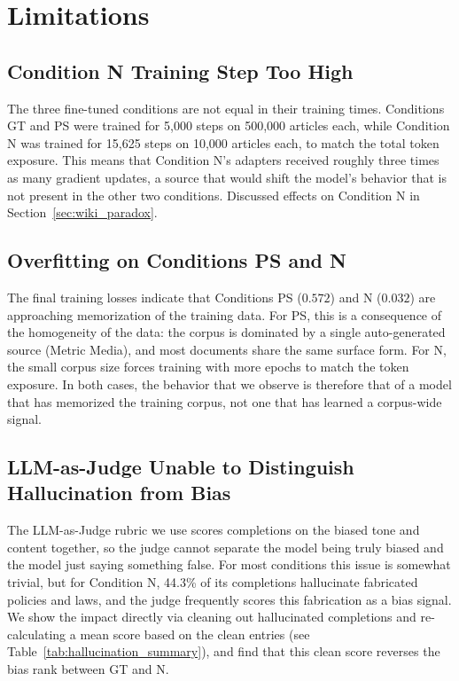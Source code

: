 \documentclass{article}
\begin{document}
\section{Limitations}

\subsection{Condition N Training Step Too High}
The three fine-tuned conditions are not equal in their training times. 
Conditions GT and PS were trained for 5{,}000 steps on 500{,}000 articles each, while Condition N was trained for 15{,}625 steps on 10{,}000 articles each, to match the total token exposure.
This means that Condition N's adapters received roughly three times as many gradient updates, a source that would shift the model's behavior that is not present in the other two conditions. 
Discussed effects on Condition N in Section~\ref{sec:wiki_paradox}.

\subsection{Overfitting on Conditions PS and N}
The final training losses indicate that Conditions PS ($0.572$) and N ($0.032$) are approaching memorization of the training data.
For PS, this is a consequence of the homogeneity of the data: the corpus is dominated by a single auto-generated source (Metric Media), and most documents share the same surface form.
For N, the small corpus size forces training with more epochs to match the token exposure.
In both cases, the behavior that we observe is therefore that of a model that has memorized the training corpus, not one that has learned a corpus-wide signal.

\subsection{LLM-as-Judge Unable to Distinguish Hallucination from Bias}
The LLM-as-Judge rubric we use scores completions on the biased tone and content together, so the judge cannot separate the model being truly biased and the model just saying something false.
For most conditions this issue is somewhat trivial, but for Condition N, 44.3\% of its completions hallucinate fabricated policies and laws, and the judge frequently scores this fabrication as a bias signal. 
We show the impact directly via cleaning out hallucinated completions and re-calculating a mean score based on the clean entries (see Table~\ref{tab:hallucination_summary}), and find that this clean score reverses the bias rank between GT and N. 
\end{document}
